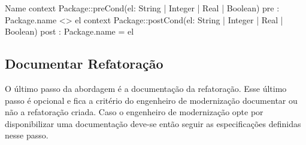 \begin{codigo}[caption={[Asserções em OCL para realizar a operação atômica \texttt{change}.] Asserções em OCL para realizar a operação atômica \texttt{change}.},escapeinside={(*@}{@*)}, mathescape=true, basicstyle=\footnotesize, label={codigo:template_assercao_juntado_change}, language=OCL]{Name}
context Package::preCond(el: String | Integer | Real | Boolean)
pre : Package.name <> el
context Package::postCond(el: String | Integer | Real | Boolean)
post : Package.name = el
\end{codigo}






\subsection{Documentar Refatoração}\label{sec:template_refatoracao}

O último passo da abordagem é a documentação da refatoração. Esse último passo é opcional e fica a critério do engenheiro de modernização documentar ou não a refatoração criada. Caso o engenheiro de modernização opte por disponibilizar uma documentação deve-se então seguir as especificações definidas nesse passo.

